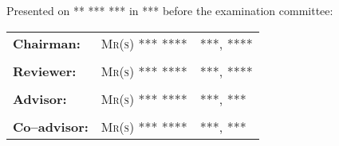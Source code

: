 \begin{titlepage}
\begin{center}
    \end{center}
    \begin{center}
        Presented on ** *** *** in *** before the examination committee:\\
    \end{center}
    \begin{center}
        \begin{tabular}{lll}
        	   \tabularnewline
            \textbf{Chairman:}   & \textsc{Mr(s) *** ****} & ***, \textsc{****}
            \tabularnewline
            \tabularnewline
            \textbf{Reviewer:}    & \textsc{Mr(s) *** ****} & ***, \textsc{****}
            \tabularnewline
            \tabularnewline
            \textbf{Advisor:}     & \textsc{Mr(s) *** ****} & ***, \textsc{***}
            \tabularnewline
            \tabularnewline
            \textbf{Co--advisor:} & \textsc{Mr(s) *** ****} & ***, \textsc{***}
        \end{tabular}
    \end{center}
    \sloppy
\end{titlepage}
